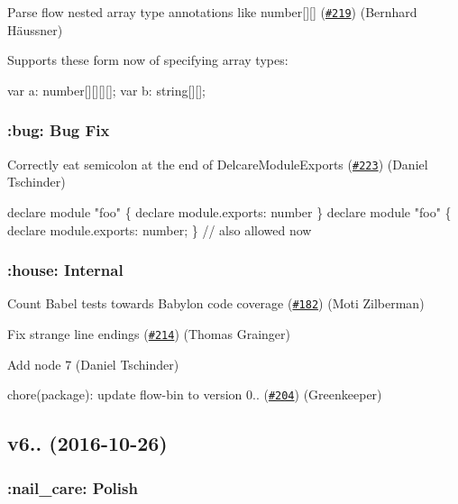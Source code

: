 Parse flow nested array type annotations like {\ttfamily number\mbox{[}\mbox{]}\mbox{[}\mbox{]}} (\href{https://github.com/babel/babylon/pull/219}{\tt \#219}) (Bernhard Häussner)

Supports these form now of specifying array types\+:


\begin{DoxyCode}
var a: number[][][][];
var b: string[][];
\end{DoxyCode}


\subsubsection*{\+:bug\+: Bug Fix}

Correctly eat semicolon at the end of {\ttfamily Delcare\+Module\+Exports} (\href{https://github.com/babel/babylon/pull/223}{\tt \#223}) (Daniel Tschinder)


\begin{DoxyCode}
declare module "foo" \{ declare module.exports: number \}
declare module "foo" \{ declare module.exports: number; \}  // also allowed now
\end{DoxyCode}


\subsubsection*{\+:house\+: Internal}


\begin{DoxyItemize}
\item Count Babel tests towards Babylon code coverage (\href{https://github.com/babel/babylon/pull/182}{\tt \#182}) (Moti Zilberman)
\item Fix strange line endings (\href{https://github.com/babel/babylon/pull/214}{\tt \#214}) (Thomas Grainger)
\item Add node 7 (Daniel Tschinder)
\item chore(package)\+: update flow-\/bin to version 0.. (\href{https://github.com/babel/babylon/pull/204}{\tt \#204}) (Greenkeeper)
\end{DoxyItemize}

\subsection*{v6.. (2016-\/10-\/26)}

\subsubsection*{\+:nail\+\_\+care\+: Polish}


